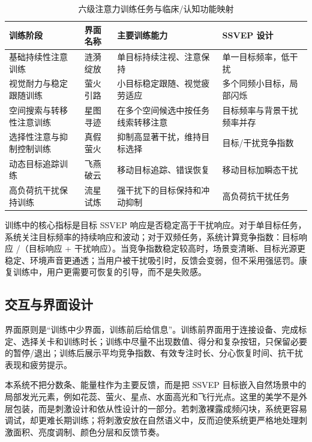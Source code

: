 \documentclass[UTF8,a4paper,zihao=5]{ctexart}
\begin{document}
\begin{table}[!htbp]
  \centering
  \caption{六级注意力训练任务与临床/认知功能映射}
  \label{tab:tasks}
  \begin{tabularx}{\linewidth}{>{\raggedright\arraybackslash}p{3.1cm}>{\raggedright\arraybackslash}p{2.1cm}>{\raggedright\arraybackslash}X>{\raggedright\arraybackslash}p{3.1cm}}
    \toprule
    训练阶段 & 界面名称 & 主要训练能力 & SSVEP 设计 \\
    \midrule
    基础持续性注意训练 & 涟漪绽放 & 单目标持续注视、注意保持 & 单一目标频率，低干扰 \\
    视觉耐力与稳定跟随训练 & 萤火引路 & 小目标稳定跟随、视觉疲劳适应 & 多个同频小目标，局部闪烁 \\
    空间搜索与转移性注意训练 & 星图寻迹 & 在多个空间候选中按任务线索转移注意 & 目标频率与背景干扰频率并存 \\
    选择性注意与抑制控制训练 & 真假萤火 & 抑制高显著干扰，维持目标选择 & 目标/干扰竞争指数 \\
    动态目标追踪训练 & 飞燕破云 & 移动目标追踪、错误恢复 & 移动目标加瞬态干扰 \\
    高负荷抗干扰保持训练 & 流星试炼 & 强干扰下的目标保持和冲动抑制 & 高负荷抗干扰任务 \\
    \bottomrule
  \end{tabularx}
\end{table}

训练中的核心指标是目标 SSVEP 响应是否稳定高于干扰响应。对于单目标任务，系统关注目标频率的持续响应和波动；对于双频任务，系统计算竞争指数：目标响应 /（目标响应 + 干扰响应）。当竞争指数稳定较高时，场景变清晰、目标光源更稳定、环境声音更通透；当用户被干扰吸引时，反馈会变弱，但不采用强惩罚。康复训练中，用户更需要可恢复的引导，而不是失败感。

\subsection{交互与界面设计}

界面原则是“训练中少界面，训练前后给信息”。训练前界面用于连接设备、完成标定、选择关卡和训练时长；训练中尽量不出现数值、得分和复杂按钮，只保留必要的暂停/退出；训练后展示平均竞争指数、有效专注时长、分心恢复时间、抗干扰表现和疲劳提示。

本系统不把分数条、能量柱作为主要反馈，而是把 SSVEP 目标嵌入自然场景中的局部发光元素，例如花蕊、萤火、星点、水面高光和飞行光点。这里的美学不是外层包装，而是刺激设计和依从性设计的一部分。若刺激裸露成频闪块，系统更容易调试，却更难长期训练；将刺激安放在自然语义中，反而迫使系统更严格地处理刺激面积、亮度调制、颜色分层和反馈节奏。
\end{document}
